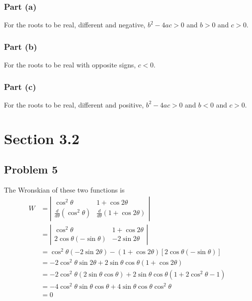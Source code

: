 \documentclass[12pt]{article}
\begin{document}
\subsubsection*{Part (a)}
\label{sec:org45bf78f}
For the roots to be real, different and negative, \(b^2 - 4ac > 0\) and \(b>0\)
and \(c>0\).
\subsubsection*{Part (b)}
\label{sec:org89dc0b3}
For the roots to be real with opposite signs, \(c < 0\).
\subsubsection*{Part (c)}
\label{sec:org8ecf622}
For the roots to be real, different and positive, \(b^2-4ac>0\) and \(b<0\) and \(c>0\).
\section*{Section 3.2}
\label{sec:orge79dfd1}
\subsection*{Problem 5}
\label{sec:orge39ff55}
The Wronskian of these two functions is
\begin{align*}
W &=\left|\begin{array}{cc}
\cos ^{2} \theta & 1+\cos 2 \theta \\
\frac{d}{d \theta}\left(\cos ^{2} \theta\right) & \frac{d}{d \theta}(1+\cos 2 \theta)
\end{array}\right| \\
&=\left|\begin{array}{cc}
\cos ^{2} \theta & 1+\cos 2 \theta \\
2 \cos \theta(-\sin \theta) & -2 \sin 2 \theta
\end{array}\right| \\
&=\cos ^{2} \theta(-2 \sin 2 \theta)-(1+\cos 2 \theta)[2 \cos \theta(-\sin \theta)] \\
&=-2 \cos ^{2} \theta \sin 2 \theta+2 \sin \theta \cos \theta(1+\cos 2 \theta) \\
&=-2 \cos ^{2} \theta(2 \sin \theta \cos \theta)+2 \sin \theta \cos \theta\left(1+2 \cos ^{2} \theta-1\right) \\
&=-4 \cos ^{2} \theta \sin \theta \cos \theta+4 \sin \theta \cos \theta \cos ^{2} \theta \\
&=0
\end{align*}
\end{document}
